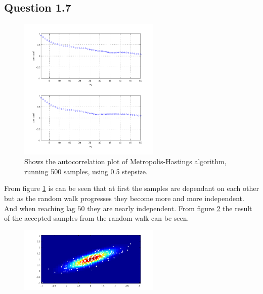 \documentclass[a4paper, 10pt, final]{article}
\begin{document}

\subsection*{Question 1.7}

\begin{figure}[!htpb]
  \centering
  \includegraphics[width=0.6\textwidth]{images/q1_7a}
  \caption{Shows the autocorrelation plot of Metropolis-Hastings algorithm, running 500 samples, using 0.5 stepsize.}
  \label{fig:q1_7a}
\end{figure}

From figure \ref{fig:q1_7a} is can be seen that at first the samples
are dependant on each other but as the random walk progresses they
become more and more independent. And when reaching lag $50$ they are
nearly independent. From figure \ref{fig:q1_7b} the result of the
accepted samples from the random walk can be seen.

\begin{figure}[!htpb]
  \centering
  \includegraphics[width=0.6\textwidth]{images/q1_7b}
  \caption{}
  \label{fig:q1_7b}
\end{figure}
\end{document}
